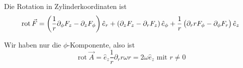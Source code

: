 \documentclass[a4paper,german,12pt,smallheadings]{scrartcl}
\begin{document}
\begin{enumerate}[a)]
    Die Rotation in Zylinderkoordinaten ist
    \begin{equation}
      \operatorname{rot} \vec{F} =
      \del{\frac{1}{r} \partial_\phi F_z - \partial_z F_\phi} \hat{e}_r +
      \del{\partial_z F_z - \partial_r F_z} \hat{e}_\phi +
      \frac{1}{r} \del{\partial_r r F_\phi - \partial_\phi F_r} \hat{e}_z
    \end{equation}

    Wir haben nur die $\phi$-Komponente, also ist
    \begin{equation}
      \operatorname{rot} \vec{A} = \hat{e}_z \frac{1}{r} \partial_r r \omega r = 2 \omega \hat{e}_z \text{ mit } r \neq 0
    \end{equation}
\end{enumerate}
\end{document}
